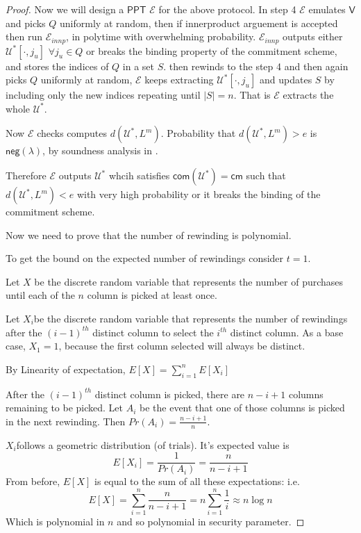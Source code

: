\documentclass[runningheads]{llncs}
\newcommand{\pnote}[1] {\textcolor{red}  {PKP: \sl{#1}}}
\def\ppt{\mathsf{PPT}}
\def\extrac{\mathcal{E}}
\def\verifier{\mathsf{V}}
\def\RS{\mathsf{RS}} %
\def\cm{\mathsf{cm}} %
\def\com{\mathsf{com}} %
\def\negl{\mathsf{neg}}
\def\oracle{\mathcal{U}^{\RS}}
\def\calU{\mathcal{U}}
\begin{document}
	\begin{proof}
		Now we will design a $\ppt$ $\extrac$ for the above protocol.
		In step 4 $\extrac$ emulates $\verifier$ and picks $Q$ uniformly at random, then if innerproduct arguement is accepted then run $\extrac_{innp}$, in polytime with overwhelming probability. $\extrac_{innp}$ outputs either $\calU^*[\cdot,j_u]$ $\forall j_u\in Q$ or breaks the binding property of the commitment scheme, and stores the indices of $Q$ in a set $S$. then rewinds to the step 4 and then again picks $Q$ uniformly at random, $\extrac$ keeps extracting $\calU^*[\cdot,j_u]$ and updates $S$ by including only the new indices repeating until $|S|=n$. That is $\extrac$ extracts the whole $\calU^*$.
		\begin{comment}
		In the next step $\extrac$ gets $\calU^*[\cdot,j_u]$ $\forall j_u \in S$. Since $|S|>k$, from $\oracle_x[\cdot,j_u]$ decoding is deterministic, so the $\extrac$ decodes $\oracle$ to $x$ and outputs $x$.
		\end{comment}
		
		Now $\extrac$ checks computes $d(\calU^*, L^m)$. Probability that $d(\calU^*,L^m) > e$ is $\negl(\lambda)$, by soundness analysis in \cite{Ligero2017}.
		
		Therefore $\extrac$ outputs $\calU^*$ whcih satisfies $\com(\calU^*) = \cm$ such that $d(\calU^*, L^m) < e$ with very high probability or it breaks the binding of the commitment scheme.
		
		Now we need to prove that the number of rewinding is polynomial.
		
		To get the bound on the expected number of rewindings consider $t=1$. 
		
		Let $X$ be the discrete random variable that represents the number of purchases until each of the $n$ column is picked at least once.
		
		Let $X_i$​ be the discrete random variable that represents the number of rewindings after the $(i-1)^{th}$ distinct column to select the $i^{th}$ distinct column. As a base case, $X_1=1$, because the first column selected will always be distinct.
		
		By Linearity of expectation, $E[X]=\sum_{i=1}^{n}E[X_i]$
		
		After the $(i-1)^{th}$ distinct column is picked, there are $n-i+1$ columns remaining to be picked. Let $A_i$ be the event that one of those columns is picked in the next rewinding. Then $Pr(A_i)=\frac{n-i+1}{n}$.
		
		$X_i$​ follows a geometric distribution (of trials). It's expected value is
		 $$E[X_i]= \frac{1}{Pr(A_i)} = \frac{n}{n-i+1}$$
		From before, $E[X]$ is equal to the sum of all these expectations: i.e.
		$$E[X] = \sum\limits_{i=1}^{n} \frac{n}{n-i+1} = n\sum\limits_{i=1}^{n} \frac{1}{i} \approx n \log n$$
		Which is polynomial in $n$ and so polynomial in security parameter.
	\end{proof}
	
\end{document}

